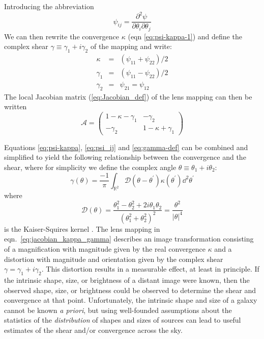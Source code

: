 Introducing the abbreviation
\begin{equation}
  \label{eq:psi_ij}
  \psi_{ij} = \frac{\partial^2 \psi}{\partial \theta_i \partial \theta_j}
\end{equation}
We can then rewrite the convergence $\kappa$ (eqn \ref{eq:psi-kappa-1}) and define the complex shear $\gamma \equiv \gamma_1 + i\gamma_2$ of the mapping and write:
\begin{equation}
  \label{eq:gamma-def}
  \begin{array}{lcl}
    \kappa & = & (\psi_{11} + \psi_{22})/2\\
    \gamma_1 & = & (\psi_{11} - \psi_{22})/2\\
    \gamma_2 & = & \psi_{21} = \psi_{12}
  \end{array}
\end{equation}
The local Jacobian matrix (\ref{eq:Jacobian_def}) of the lens mapping can then be written
\begin{equation}
  \label{eq:jacobian_kappa_gamma}
  \mathcal{A} = \left(
  \begin{array}{cc}
    1 - \kappa - \gamma_1 & -\gamma_2\\
    -\gamma_2             & 1-\kappa+\gamma_1
  \end{array}\right)
\end{equation}

Equations \ref{eq:psi-kappa}, \ref{eq:psi_ij} and \ref{eq:gamma-def} can be combined and simplified to yield the following relationship between the convergence and the shear, where for simplicity we define the complex angle
$\theta \equiv \theta_1 + i\theta_2$:
\begin{equation}
  \label{eq:gamma-kappa}
  \gamma(\theta) 
  = \frac{-1}{\pi}\int_{\mathbb{R}^2} \mathcal{D}(\theta - 
  \theta^\prime)\kappa(\theta^\prime) \dd^2\theta^\prime
\end{equation}
where 
\begin{equation}
  \label{eq:scriptD}
  \mathcal{D}(\theta) 
  = \frac{\theta_1^2 - \theta_2^2 + 2i\theta_1\theta_2}{(\theta_1^2+\theta_2^2)^2}
  = \frac{\theta^2}{|\theta|^4}
\end{equation}
is the Kaiser-Squires kernel \citep{Kaiser93}.
The lens mapping in eqn.~\ref{eq:jacobian_kappa_gamma} describes an
image transformation consisting of a magnification with magnitude 
given by the real convergence $\kappa$
and a distortion with magnitude and orientation given by the complex shear
$\gamma = \gamma_1 + i\gamma_2$.  This distortion results in a measurable
effect, at least in principle.  If the intrinsic shape, size, or brightness
of a distant image were known, then the observed shape, size, or brightness
could be observed to determine the shear and convergence at that point.
Unfortunately, the intrinsic shape and size of a galaxy cannot be known
{\it a priori}, but using well-founded assumptions about the statistics
of the {\it distribution} of shapes and sizes of sources can lead to
useful estimates of the shear and/or convergence across the sky.


